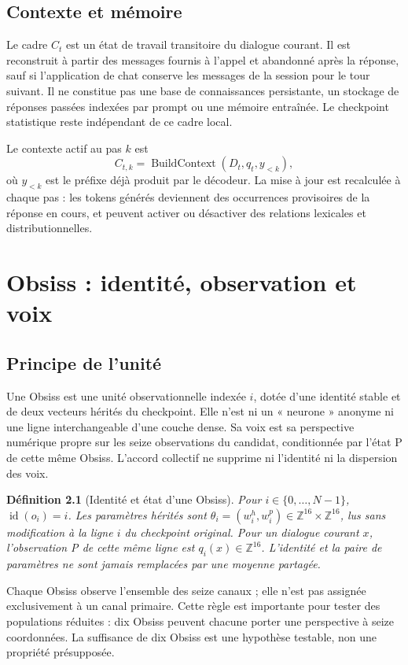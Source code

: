 \documentclass[11pt,a4paper]{report}
\newtheorem{definition}{Définition}[chapter]
\begin{document}
\section{Contexte et mémoire}
Le cadre $C_t$ est un état de travail transitoire du dialogue courant. Il est reconstruit à partir des messages fournis à l'appel et abandonné après la réponse, sauf si l'application de chat conserve les messages de la session pour le tour suivant. Il ne constitue pas une base de connaissances persistante, un stockage de réponses passées indexées par prompt ou une mémoire entraînée. Le checkpoint statistique reste indépendant de ce cadre local.

Le contexte actif au pas $k$ est
\[
C_{t,k}=\operatorname{BuildContext}(D_t,q_t,y_{<k}),
\]
où $y_{<k}$ est le préfixe déjà produit par le décodeur. La mise à jour est recalculée à chaque pas : les tokens générés deviennent des occurrences provisoires de la réponse en cours, et peuvent activer ou désactiver des relations lexicales et distributionnelles.

\chapter{Obsiss : identité, observation et voix}
\section{Principe de l'unité}
Une Obsiss est une unité observationnelle indexée $i$, dotée d'une identité stable et de deux vecteurs hérités du checkpoint. Elle n'est ni un « neurone » anonyme ni une ligne interchangeable d'une couche dense. Sa voix est sa perspective numérique propre sur les seize observations du candidat, conditionnée par l'état P de cette même Obsiss. L'accord collectif ne supprime ni l'identité ni la dispersion des voix.

\begin{definition}[Identité et état d'une Obsiss]
Pour $i\in\{0,\ldots,N-1\}$, $\operatorname{id}(o_i)=i$. Les paramètres hérités sont $\theta_i=(w_i^h,w_i^p)\in\mathbb Z^{16}\times\mathbb Z^{16}$, lus sans modification à la ligne $i$ du checkpoint original. Pour un dialogue courant $x$, l'observation P de cette même ligne est $q_i(x)\in\mathbb Z^{16}$. L'identité et la paire de paramètres ne sont jamais remplacées par une moyenne partagée.
\end{definition}

Chaque Obsiss observe l'ensemble des seize canaux ; elle n'est pas assignée exclusivement à un canal primaire. Cette règle est importante pour tester des populations réduites : dix Obsiss peuvent chacune porter une perspective à seize coordonnées. La suffisance de dix Obsiss est une hypothèse testable, non une propriété présupposée.
\end{document}
